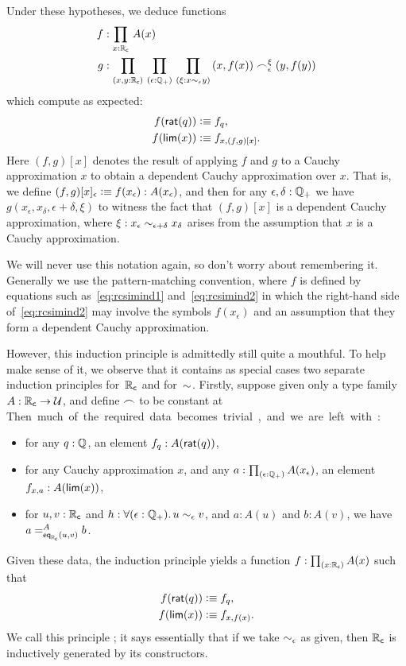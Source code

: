 Under these hypotheses, we deduce functions
\begin{align*}
  f&:\prd{x:\RC} A(x)\\
  g&:\prd{x,y:\RC}{\epsilon:\Qp}{\xi:x\close{\epsilon} y}
  (x,f(x)) \bsim_\epsilon^\xi (y,f(y))
\end{align*}
which compute as expected:
\begin{align}
  f(\rcrat(q)) &\defeq f_q, \label{eq:rcsimind1}\\
  f(\rclim(x)) &\defeq f_{x,(f,g)[x]}. \label{eq:rcsimind2}
\end{align}
Here $(f,g)[x]$ denotes the result of applying $f$ and $g$ to a Cauchy approximation $x$ to obtain a dependent Cauchy approximation over $x$.
That is, we define $(f,g)[x]_\epsilon \defeq f(x_\epsilon) : A(x_\epsilon)$, and then for any $\epsilon,\delta:\Qp$ we have $g(x_\epsilon,x_\delta,\epsilon+\delta,\xi)$ to witness the fact that $(f,g)[x]$ is a dependent Cauchy approximation, where $\xi: x_\epsilon \close{\epsilon+\delta} x_\delta$ arises from the assumption that $x$ is a Cauchy approximation.

We will never use this notation again, so don't worry about remembering it.
Generally we use the pattern-matching convention, where $f$ is defined by equations such as~\eqref{eq:rcsimind1} and~\eqref{eq:rcsimind2} in which the right-hand side of~\eqref{eq:rcsimind2} may involve the symbols $f(x_\epsilon)$ and an assumption that they form a dependent Cauchy approximation.

However, this induction principle is admittedly still quite a mouthful.
To help make sense of it, we observe that it contains as special cases two separate induction principles for~$\RC$ and for~$\closesym$.
Firstly, suppose given only a type family $A:\RC\to\type$, and define $\bsim$ to be constant at \unit.
Then much of the required data becomes trivial, and we are left with:
\begin{itemize}
\item for any $q : \Q$, an element $f_q:A(\rcrat(q))$,
\item for any Cauchy approximation $x$, and any $a:\prd{\epsilon:\Qp} A(x_\epsilon)$, an element $f_{x,a}:A(\rclim(x))$,
\item for $u, v : \RC$ and $h:\fall{\epsilon : \Qp} u \close\epsilon v$, and $a:A(u)$ and $b:A(v)$, we have $\dpath{A}{\rceq(u,v)}{a}{b}$.
\end{itemize}
Given these data, the induction principle yields a function $f:\prd{x:\RC} A(x)$ such that
\begin{align*}
  f(\rcrat(q)) &\defeq f_q,\\
  f(\rclim(x)) &\defeq f_{x,f(x)}.
\end{align*}
We call this principle ; it says essentially that if we take $\close\epsilon$ as given, then $\RC$ is inductively generated by its constructors.

